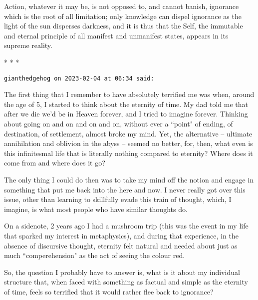 \begin{quotex}
Action, whatever it may be, is not opposed to, and cannot banish, ignorance which is the root of all limitation; only knowledge can dispel ignorance as the light of the sun disperses darkness, and it is thus that the Self, the immutable and eternal principle of all manifest and unmanifest states, appears in its supreme reality. 

\end{quotex}



\begin{center}* * *\end{center}

\begin{footnotesize}\begin{sffamily}



\texttt{gianthedgehog on 2023-02-04 at 06:34 said: }

The first thing that I remember to have absolutely terrified me was when, around the age of 5, I started to think about the eternity of time. My dad told me that after we die we'd be in Heaven forever, and I tried to imagine forever. Thinking about going on and on and on and on, without ever a ``point" of ending, of destination, of settlement, almost broke my mind. Yet, the alternative – ultimate annihilation and oblivion in the abyss – seemed no better, for, then, what even is this infinitesmal life that is literally nothing compared to eternity? Where does it come from and where does it go?

The only thing I could do then was to take my mind off the notion and engage in something that put me back into the here and now. I never really got over this issue, other than learning to skillfully evade this train of thought, which, I imagine, is what most people who have similar thoughts do.

On a sidenote, 2 years ago I had a mushroom trip (this was the event in my life that sparked my interest in metaphysics), and during that experience, in the absence of discursive thought, eternity felt natural and needed about just as much ``comperehension" as the act of seeing the colour red.

So, the question I probably have to answer is, what is it about my individual structure that, when faced with something as factual and simple as the eternity of time, feels so terrified that it would rather flee back to ignorance?



\end{sffamily}
\end{footnotesize}
